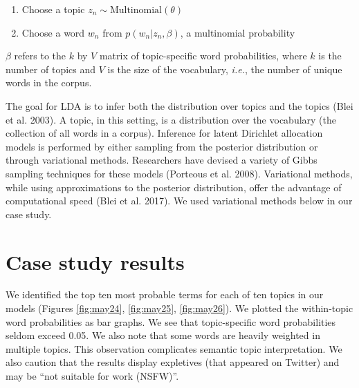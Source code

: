 \documentclass[
]{article}
\providecommand{\tightlist}{%
  \setlength{\itemsep}{0pt}\setlength{\parskip}{0pt}}
\begin{document}
\begin{enumerate}
\def\labelenumi{\alph{enumi}.}
\tightlist
\item
  Choose a topic \(z_n \sim \text{Multinomial}(\theta)\)\\
\item
  Choose a word \(w_n\) from \(p(w_n | z_n, \beta)\), a multinomial probability
\end{enumerate}

\(\beta\) refers to the \(k\) by \(V\) matrix of topic-specific word probabilities, where \(k\)
is the number of topics and \(V\) is the size of the vocabulary, \emph{i.e.}, the number of unique words in the corpus.

The goal for LDA is to infer both the distribution over topics and
the topics (Blei et al. 2003). A topic, in this setting, is a distribution over
the vocabulary (the collection of all words in a corpus).
Inference for latent Dirichlet allocation models is performed by either
sampling from the posterior distribution or through variational methods. Researchers
have devised a variety of Gibbs sampling techniques for these models (Porteous et al. 2008).
Variational methods, while using approximations to the posterior distribution, offer the
advantage of computational speed (Blei et al. 2017). We used variational methods below in our case study.

\hypertarget{case-study-results}{%
\section{Case study results}\label{case-study-results}}

We identified the top ten most probable terms for each of ten topics in our models
(Figures \ref{fig:may24}, \ref{fig:may25}, \ref{fig:may26}).
We plotted the within-topic word probabilities as bar graphs. We see that topic-specific
word probabilities seldom exceed 0.05. We also note that some words are heavily weighted in
multiple topics. This observation complicates semantic topic interpretation. We
also caution that the results display expletives (that appeared on Twitter) and may be ``not suitable for work (NSFW)''.
\end{document}
